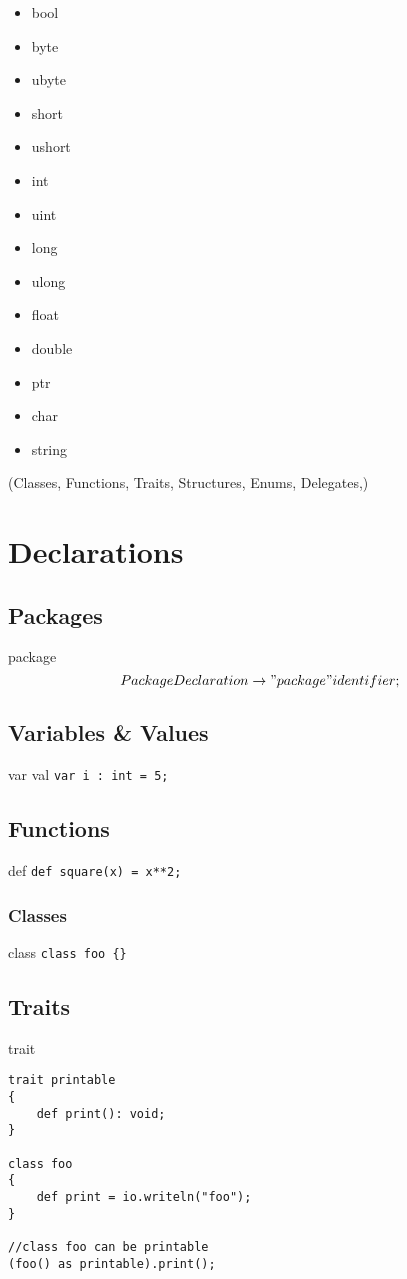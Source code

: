 \documentclass[9pt,a4paper]{article}
\begin{document}
\begin{multicols}{4}
\begin{itemize}
\item bool 
\item byte 
\item ubyte 
\item short 
\item ushort 
\item int 
\item uint 
\item long 
\item ulong 
\item float 
\item double 
\item ptr 
\item char 
\item string
\end{itemize}
\end{multicols}


(Classes, Functions, Traits, Structures, Enums, Delegates,)

\section{Declarations}

\subsection*{Packages}
package 
\[PackageDeclaration \rightarrow "package" identifier;\]

\subsection*{Variables \& Values}
var val
\lstinline!var i : int = 5;!

\subsection*{Functions}
def
\lstinline!def square(x) = x**2;!

\subsubsection*{Classes}
class
\lstinline!class foo {}!

\subsection*{Traits}
trait
\begin{lstlisting}
trait printable
{
	def print(): void;
}

class foo
{
	def print = io.writeln("foo");
}

//class foo can be printable
(foo() as printable).print();
\end{lstlisting}
\end{document}
